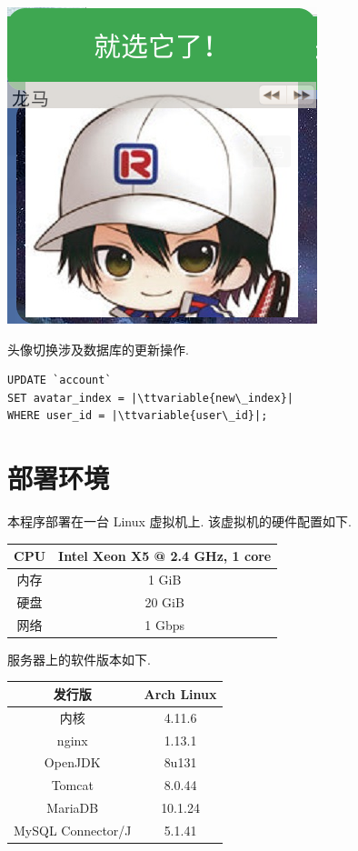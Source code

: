 \documentclass[a4paper,10pt]{article}
\newcommand{\ttvariable}[1]{\texttt{\textit{#1}}}
\begin{document}
\begin{center}
	\includegraphics[scale=0.6]{avatar.png}
\end{center}

头像切换涉及数据库的更新操作.
\begin{verbatim}
UPDATE `account`
SET avatar_index = |\ttvariable{new\_index}|
WHERE user_id = |\ttvariable{user\_id}|;
\end{verbatim}

\section{部署环境}

本程序部署在一台 Linux 虚拟机上. 该虚拟机的硬件配置如下.
\begin{center}
	\begin{tabular}{c|c} \hline
		CPU & Intel Xeon X5 @ 2.4 GHz, 1 core \\ \hline 
		内存 & 1 GiB \\ \hline
		硬盘 & 20 GiB \\ \hline
		网络 & 1 Gbps \\ \hline
	\end{tabular}
\end{center}

服务器上的软件版本如下.
\begin{center}
	\begin{tabular}{c|c} \hline
		发行版 & Arch Linux \\ \hline 
		内核 & 4.11.6 \\ \hline
		nginx & 1.13.1 \\ \hline
		OpenJDK & 8u131 \\ \hline
		Tomcat & 8.0.44 \\ \hline
		MariaDB & 10.1.24 \\ \hline
		MySQL Connector/J & 5.1.41 \\ \hline
	\end{tabular}
\end{center}
\end{document}
